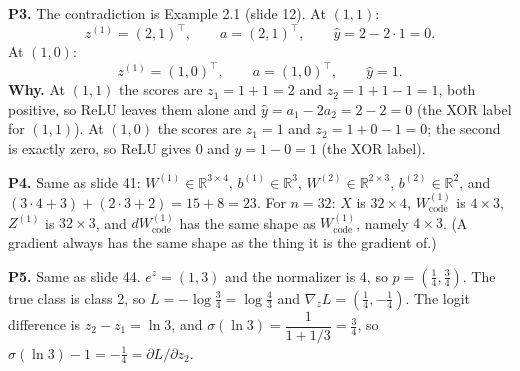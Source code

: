 \textbf{P3.} The contradiction is Example 2.1 (slide 12). At $(1,1)$:
\[
z^{(1)}=(2,1)^\top, \qquad a=(2,1)^\top, \qquad \hat{y}=2-2\cdot1=0 .
\]
At $(1,0)$:
\[
z^{(1)}=(1,0)^\top, \qquad a=(1,0)^\top, \qquad \hat{y}=1 .
\]
\textbf{Why.} At $(1,1)$ the scores are $z_1=1+1=2$ and $z_2=1+1-1=1$, both positive, so ReLU leaves them alone and $\hat{y}=a_1-2a_2=2-2=0$ (the XOR label for $(1,1)$). At $(1,0)$ the scores are $z_1=1$ and $z_2=1+0-1=0$; the second is exactly zero, so ReLU gives $0$ and $\hat{y}=1-0=1$ (the XOR label).

\textbf{P4.} Same as slide 41: $W^{(1)}\in\mathbb{R}^{3\times4}$, $b^{(1)}\in\mathbb{R}^3$, $W^{(2)}\in\mathbb{R}^{2\times3}$, $b^{(2)}\in\mathbb{R}^2$, and $(3\cdot4+3)+(2\cdot3+2)=15+8=23$. For $n=32$: $X$ is $32\times4$, $W^{(1)}_{\text{code}}$ is $4\times3$, $Z^{(1)}$ is $32\times3$, and $dW^{(1)}_{\text{code}}$ has the same shape as $W^{(1)}_{\text{code}}$, namely $4\times3$. (A gradient always has the same shape as the thing it is the gradient of.)

\textbf{P5.} Same as slide 44. $e^{z}=(1,3)$ and the normalizer is $4$, so $p=(\tfrac14,\tfrac34)$. The true class is class 2, so $L=-\log\tfrac34=\log\tfrac43$ and $\nabla_zL=(\tfrac14,-\tfrac14)$. The logit difference is $z_2-z_1=\ln3$, and $\sigma(\ln3)=\dfrac{1}{1+1/3}=\tfrac34$, so $\sigma(\ln3)-1=-\tfrac14=\partial L/\partial z_2$.

